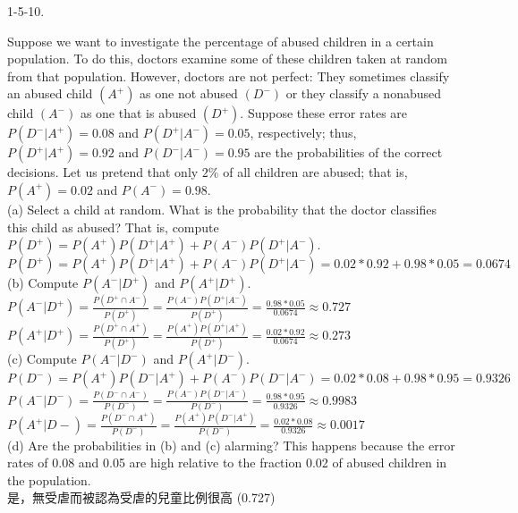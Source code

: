 \documentclass[12pt]{book}
\begin{document}
\begin{CJK}{UTF8}{bsmi}
1-5-10. \begin{minipage}[t]{\dimexpr\linewidth-2em}
Suppose we want to investigate the percentage of abused children in a certain population. To do this, doctors examine some of these children taken at random from that population. However, doctors are not perfect:
They sometimes classify an abused child $(A^+)$ as one not abused $(D^-)$ or they classify a nonabused child $(A^-)$ as one that is abused $(D^+)$. Suppose these error rates are $P(D^- | A^+) = 0.08$ and $P(D^+ | A^-) = 0.05$, respectively; thus, $P(D^+ | A^+) = 0.92$ and $P(D^- | A^-) = 0.95$ are the probabilities of the correct decisions. Let us pretend that only $2\%$ of all children are abused; that is, $P(A^+) = 0.02$ and $P(A^-) = 0.98$. \\
(a) Select a child at random. What is the probability that the doctor classifies this child as abused? That is, compute $P(D^+) = P(A^+)P(D^+ | A^+) + P(A^-)P(D^+ | A^-)$. \\
$P(D^+) = P(A^+)P(D^+ | A^+) + P(A^-)P(D^+ | A^-)=0.02*0.92+0.98*0.05=0.0674$ \\
(b) Compute $P(A^- | D^+)$ and $P(A^+ | D^+)$. \\
$\displaystyle P(A^- | D^+)=\frac{P(D^+\cap A^-)}{P(D^+)}=\frac{P(A^-)P(D^+ | A^-)}{P(D^+)}=\frac{0.98*0.05}{0.0674}\approx0.727$ \\
$\displaystyle P(A^+ | D^+)=\frac{P(D^+\cap A^+)}{P(D^+)}=\frac{P(A^+)P(D^+ | A^+)}{P(D^+)}=\frac{0.02*0.92}{0.0674}\approx0.273$ \\
(c) Compute $P(A^- | D^-)$ and $P(A^+ | D^-)$. \\
$P(D^-) = P(A^+)P(D^- | A^+) + P(A^-)P(D^- | A^-)=0.02*0.08+0.98*0.95=0.9326$ \\
$\displaystyle P(A^- | D^-)=\frac{P(D^-\cap A^-)}{P(D^-)}=\frac{P(A^-)P(D^- | A^-)}{P(D^-)}=\frac{0.98*0.95}{0.9326}\approx0.9983$ \\
$\displaystyle P(A^+ | D-)=\frac{P(D^-\cap A^+)}{P(D^-)}=\frac{P(A^+)P(D^- | A^+)}{P(D^-)}=\frac{0.02*0.08}{0.9326}\approx0.0017$ \\
(d) Are the probabilities in (b) and (c) alarming? This happens because the error rates of 0.08 and 0.05 are high relative to the fraction 0.02 of abused children in the population. \\
是，無受虐而被認為受虐的兒童比例很高 (0.727)
\end{minipage}\\


\end{CJK}
\end{document}
